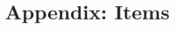 \documentclass[floatsintext,man]{apa6}
\begin{document}
%

\newpage
\hypertarget{appendix-items}{%
\section{Appendix: Items}\label{appendix-items}}

\setcounter{table}{0} \renewcommand{\thetable}{A\arabic{table}}
\end{document}

